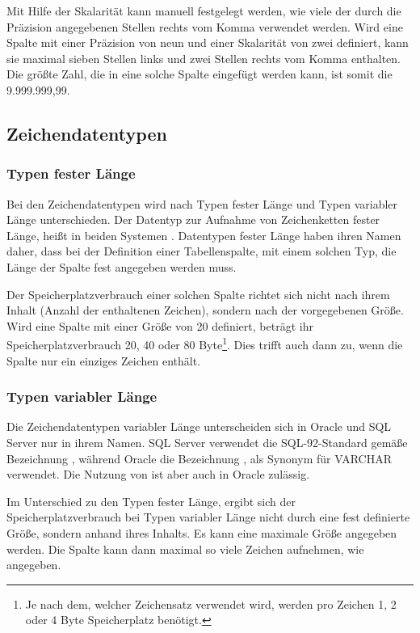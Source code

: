 Mit Hilfe der Skalarität kann manuell festgelegt werden, wie viele der durch die Präzision angegebenen Stellen rechts vom Komma verwendet werden. Wird eine Spalte mit einer Präzision von neun und einer Skalarität von zwei definiert, kann sie maximal sieben Stellen links und zwei Stellen rechts vom Komma enthalten. Die größte Zahl, die in eine solche Spalte eingefügt werden kann, ist somit die 9.999.999,99.
\subsection{Zeichendatentypen}
\subsubsection{Typen fester Länge}
Bei den Zeichendatentypen wird nach Typen fester Länge und Typen variabler Länge unterschieden. Der Datentyp zur Aufnahme von Zeichenketten fester Länge, heißt in beiden Systemen . Datentypen fester Länge haben ihren Namen daher, dass bei der Definition einer Tabellenspalte, mit einem solchen Typ, die Länge der Spalte fest angegeben werden muss.
\begin{merke}
    Der Speicherplatzverbrauch einer solchen Spalte richtet sich nicht nach ihrem Inhalt (Anzahl der enthaltenen Zeichen), sondern nach der vorgegebenen Größe. Wird eine Spalte mit einer Größe von 20 definiert, beträgt ihr Speicherplatzverbrauch 20, 40 oder 80 Byte\footnote{Je nach dem, welcher Zeichensatz verwendet wird, werden pro Zeichen 1, 2 oder 4 Byte Speicherplatz benötigt.}. Dies trifft auch dann zu, wenn die Spalte nur ein einziges Zeichen enthält.
\end{merke}
\subsubsection{Typen variabler Länge}
Die Zeichendatentypen variabler Länge unterscheiden sich in Oracle und SQL Server nur in ihrem Namen. SQL Server verwendet die SQL-92-Standard gemäße Bezeichnung , während Oracle die Bezeichnung , als Synonym für VARCHAR verwendet. Die Nutzung von  ist aber auch in Oracle zulässig.

\begin{merke}
    Im Unterschied zu den Typen fester Länge, ergibt sich der Speicherplatzverbrauch bei Typen variabler Länge nicht durch eine fest definierte Größe, sondern anhand ihres Inhalts. Es kann eine maximale Größe angegeben werden. Die Spalte kann dann maximal so viele Zeichen aufnehmen, wie angegeben.
\end{merke}
